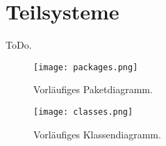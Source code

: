 \section{Teilsysteme}
\label{4-Teilsysteme}
ToDo.

\begin{figure}[ht]
    \begin{center}
    \texttt{[image: packages.png]}
    \end{center}
    \caption{Vorläufiges Paketdiagramm.}
    \label{fig:Packages}
\end{figure}

\begin{figure}[ht]
    \begin{center}
    \texttt{[image: classes.png]}
    \end{center}
    \caption{Vorläufiges Klassendiagramm.}
    \label{fig:Classes}
\end{figure}
